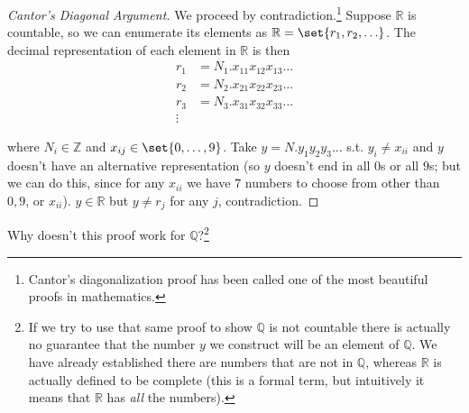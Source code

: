 \documentclass{article}
\begin{document}
\begin{proof}[Cantor's Diagonal Argument]
  We proceed by contradiction.\footnote{Cantor's diagonalization proof has been called one of the most beautiful proofs in mathematics.} Suppose $\mathbb{R}$ is countable, so we can enumerate its elements as $\mathbb{R} = \set{r_1, r_2, \ldots}$. The decimal representation of each element in $\mathbb{R}$ is then
  \begin{align*}
    r_1 & = N_1.x_{11}x_{12}x_{13}\ldots \\
    r_2 & = N_2.x_{21}x_{22}x_{23}\ldots \\
    r_3 & = N_3.x_{31}x_{32}x_{33}\ldots \\
    \vdots
  \end{align*}

  where $N_i \in \mathbb{Z}$ and $x_{ij} \in \set{0, \ldots, 9}$. Take $y = N.y_1y_2y_3\ldots$ s.t. $y_i \ne x_{ii}$ and $y$ doesn't have an alternative representation (so $y$ doesn't end in all $0$s or all $9$s; but we can do this, since for any $x_{ii}$ we have $7$ numbers to choose from other than $0, 9$, or $x_{ii}$). $y \in \mathbb{R}$ but $y \ne r_j$ for any $j$, contradiction.
\end{proof}

Why doesn't this proof work for $\mathbb{Q}$?\footnote{If we try to use that same proof to show $\mathbb{Q}$ is not countable there is actually no guarantee that the number $y$ we construct will be an element of $\mathbb{Q}$. We have already established there are numbers that are not in $\mathbb{Q}$, whereas $\mathbb{R}$ is actually defined to be complete (this is a formal term, but intuitively it means that $\mathbb{R}$ has \textit{all} the numbers).}
\end{document}
